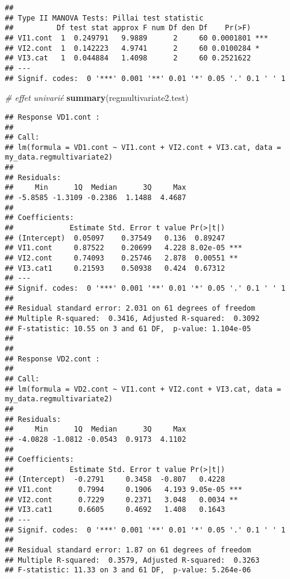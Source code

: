 \documentclass[
]{book}
\newenvironment{Shaded}{\begin{snugshade}}{\end{snugshade}}
\newcommand{\CommentTok}[1]{\textcolor[rgb]{0.56,0.35,0.01}{\textit{#1}}}
\newcommand{\KeywordTok}[1]{\textcolor[rgb]{0.13,0.29,0.53}{\textbf{#1}}}
\newcommand{\NormalTok}[1]{#1}
\begin{document}
\begin{verbatim}
## 
## Type II MANOVA Tests: Pillai test statistic
##          Df test stat approx F num Df den Df    Pr(>F)    
## VI1.cont  1  0.249791   9.9889      2     60 0.0001801 ***
## VI2.cont  1  0.142223   4.9741      2     60 0.0100284 *  
## VI3.cat   1  0.044884   1.4098      2     60 0.2521622    
## ---
## Signif. codes:  0 '***' 0.001 '**' 0.01 '*' 0.05 '.' 0.1 ' ' 1
\end{verbatim}

\begin{Shaded}
\begin{Highlighting}[]
\CommentTok{# effet univarié}
\KeywordTok{summary}\NormalTok{(regmultivariate2.test)}
\end{Highlighting}
\end{Shaded}

\begin{verbatim}
## Response VD1.cont :
## 
## Call:
## lm(formula = VD1.cont ~ VI1.cont + VI2.cont + VI3.cat, data = my_data.regmultivariate2)
## 
## Residuals:
##     Min      1Q  Median      3Q     Max 
## -5.8585 -1.3109 -0.2386  1.1488  4.4687 
## 
## Coefficients:
##             Estimate Std. Error t value Pr(>|t|)    
## (Intercept)  0.05097    0.37549   0.136  0.89247    
## VI1.cont     0.87522    0.20699   4.228 8.02e-05 ***
## VI2.cont     0.74093    0.25746   2.878  0.00551 ** 
## VI3.cat1     0.21593    0.50938   0.424  0.67312    
## ---
## Signif. codes:  0 '***' 0.001 '**' 0.01 '*' 0.05 '.' 0.1 ' ' 1
## 
## Residual standard error: 2.031 on 61 degrees of freedom
## Multiple R-squared:  0.3416,	Adjusted R-squared:  0.3092 
## F-statistic: 10.55 on 3 and 61 DF,  p-value: 1.104e-05
## 
## 
## Response VD2.cont :
## 
## Call:
## lm(formula = VD2.cont ~ VI1.cont + VI2.cont + VI3.cat, data = my_data.regmultivariate2)
## 
## Residuals:
##     Min      1Q  Median      3Q     Max 
## -4.0828 -1.0812 -0.0543  0.9173  4.1102 
## 
## Coefficients:
##             Estimate Std. Error t value Pr(>|t|)    
## (Intercept)  -0.2791     0.3458  -0.807   0.4228    
## VI1.cont      0.7994     0.1906   4.193 9.05e-05 ***
## VI2.cont      0.7229     0.2371   3.048   0.0034 ** 
## VI3.cat1      0.6605     0.4692   1.408   0.1643    
## ---
## Signif. codes:  0 '***' 0.001 '**' 0.01 '*' 0.05 '.' 0.1 ' ' 1
## 
## Residual standard error: 1.87 on 61 degrees of freedom
## Multiple R-squared:  0.3579,	Adjusted R-squared:  0.3263 
## F-statistic: 11.33 on 3 and 61 DF,  p-value: 5.264e-06
\end{verbatim}
\end{document}

